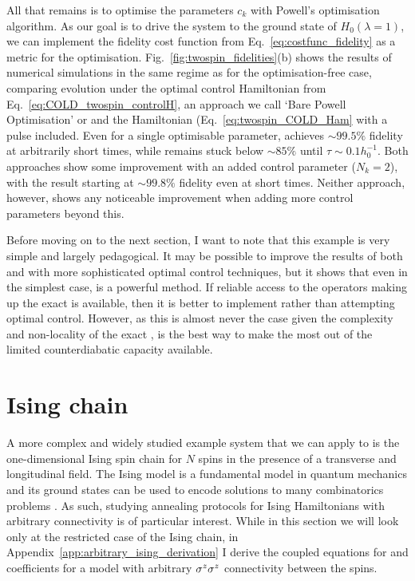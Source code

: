 All that remains is to optimise the parameters $c_k$ with Powell's optimisation algorithm. As our goal is to drive the system to the ground state of $H_0(\lambda = 1)$, we can implement the fidelity cost function from Eq.~\eqref{eq:costfunc_fidelity} as a metric for the optimisation. Fig.~\ref{fig:twospin_fidelities}(b) shows the results of numerical simulations in the same regime as for the optimisation-free case, comparing evolution under the optimal control Hamiltonian from Eq.~\eqref{eq:COLD_twospin_controlH}, an approach we call `Bare Powell Optimisation' or  and the  Hamiltonian (Eq.~\eqref{eq:twospin_COLD_Ham} with a   pulse included. Even for a single optimisable parameter,  achieves $\sim 99.5\%$ fidelity at arbitrarily short times, while  remains stuck below $\sim 85\%$ until $\tau \sim 0.1h_0^{-1}$. Both approaches show some improvement with an added control parameter ($N_k = 2$), with the  result starting at $\sim 99.8\%$ fidelity even at short times. Neither approach, however, shows any noticeable improvement when adding more control parameters beyond this. 

Before moving on to the next section, I want to note that this example is very simple and largely pedagogical. It may be possible to improve the results of both  and  with more sophisticated optimal control techniques, but it shows that even in the simplest case,  is a powerful method. If reliable access to the operators making up the exact  is available, then it is better to implement  rather than attempting optimal control. However, as this is almost never the case given the complexity and non-locality of the exact ,  is the best way to make the most out of the limited counterdiabatic capacity available.

\section{Ising chain}\label{sec:5.2_Ising_chain}

A more complex and widely studied example system that we can apply  to is the one-dimensional Ising spin chain for $N$ spins in the presence of a transverse and longitudinal field. The Ising model is a fundamental model in quantum mechanics and its ground states can be used to encode solutions to many combinatorics problems \cite{mohseni_ising_2022, ebadi_quantum_2022, pichler_quantum_2018}. As such, studying annealing protocols for Ising Hamiltonians with arbitrary connectivity is of particular interest. While in this section we will look only at the restricted case of the Ising chain, in Appendix~\ref{app:arbitrary_ising_derivation} I derive the coupled equations for  and   coefficients for a model with arbitrary $\sigma^z\sigma^z$ connectivity between the spins.

